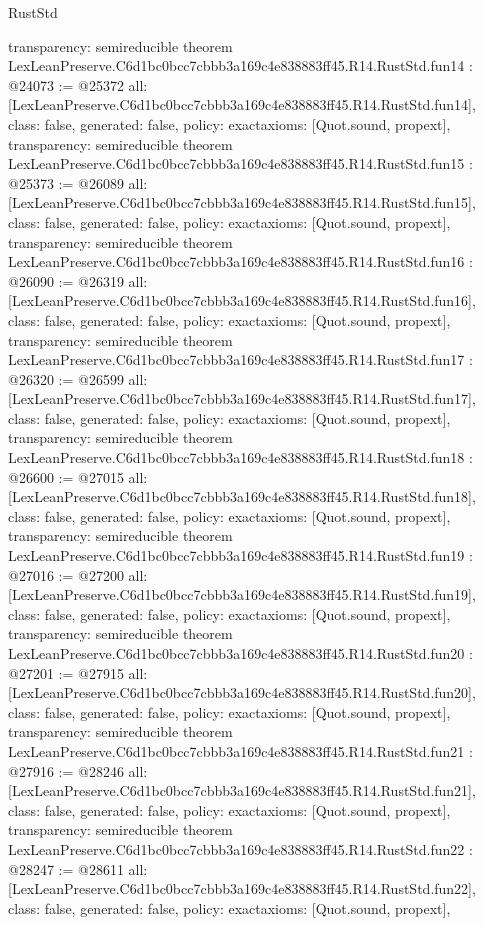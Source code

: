 \begin{lexlean}{RustStd}
\begin{coremodule}
{  transparency: semireducible
}
theorem LexLeanPreserve.C6d1bc0bcc7cbbb3a169c4e838883ff45.R14.RustStd.fun14 : @24073 := @25372 {
  all: [LexLeanPreserve.C6d1bc0bcc7cbbb3a169c4e838883ff45.R14.RustStd.fun14],
  class: false,
  generated: false,
  policy: exact{axioms: [Quot.sound, propext]},
  transparency: semireducible
}
theorem LexLeanPreserve.C6d1bc0bcc7cbbb3a169c4e838883ff45.R14.RustStd.fun15 : @25373 := @26089 {
  all: [LexLeanPreserve.C6d1bc0bcc7cbbb3a169c4e838883ff45.R14.RustStd.fun15],
  class: false,
  generated: false,
  policy: exact{axioms: [Quot.sound, propext]},
  transparency: semireducible
}
theorem LexLeanPreserve.C6d1bc0bcc7cbbb3a169c4e838883ff45.R14.RustStd.fun16 : @26090 := @26319 {
  all: [LexLeanPreserve.C6d1bc0bcc7cbbb3a169c4e838883ff45.R14.RustStd.fun16],
  class: false,
  generated: false,
  policy: exact{axioms: [Quot.sound, propext]},
  transparency: semireducible
}
theorem LexLeanPreserve.C6d1bc0bcc7cbbb3a169c4e838883ff45.R14.RustStd.fun17 : @26320 := @26599 {
  all: [LexLeanPreserve.C6d1bc0bcc7cbbb3a169c4e838883ff45.R14.RustStd.fun17],
  class: false,
  generated: false,
  policy: exact{axioms: [Quot.sound, propext]},
  transparency: semireducible
}
theorem LexLeanPreserve.C6d1bc0bcc7cbbb3a169c4e838883ff45.R14.RustStd.fun18 : @26600 := @27015 {
  all: [LexLeanPreserve.C6d1bc0bcc7cbbb3a169c4e838883ff45.R14.RustStd.fun18],
  class: false,
  generated: false,
  policy: exact{axioms: [Quot.sound, propext]},
  transparency: semireducible
}
theorem LexLeanPreserve.C6d1bc0bcc7cbbb3a169c4e838883ff45.R14.RustStd.fun19 : @27016 := @27200 {
  all: [LexLeanPreserve.C6d1bc0bcc7cbbb3a169c4e838883ff45.R14.RustStd.fun19],
  class: false,
  generated: false,
  policy: exact{axioms: [Quot.sound, propext]},
  transparency: semireducible
}
theorem LexLeanPreserve.C6d1bc0bcc7cbbb3a169c4e838883ff45.R14.RustStd.fun20 : @27201 := @27915 {
  all: [LexLeanPreserve.C6d1bc0bcc7cbbb3a169c4e838883ff45.R14.RustStd.fun20],
  class: false,
  generated: false,
  policy: exact{axioms: [Quot.sound, propext]},
  transparency: semireducible
}
theorem LexLeanPreserve.C6d1bc0bcc7cbbb3a169c4e838883ff45.R14.RustStd.fun21 : @27916 := @28246 {
  all: [LexLeanPreserve.C6d1bc0bcc7cbbb3a169c4e838883ff45.R14.RustStd.fun21],
  class: false,
  generated: false,
  policy: exact{axioms: [Quot.sound, propext]},
  transparency: semireducible
}
theorem LexLeanPreserve.C6d1bc0bcc7cbbb3a169c4e838883ff45.R14.RustStd.fun22 : @28247 := @28611 {
  all: [LexLeanPreserve.C6d1bc0bcc7cbbb3a169c4e838883ff45.R14.RustStd.fun22],
  class: false,
  generated: false,
  policy: exact{axioms: [Quot.sound, propext]},
}
\end{coremodule}
\end{lexlean}
